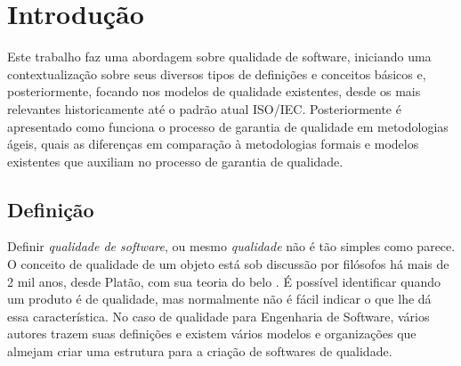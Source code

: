 \documentclass[
	12pt,				%
	openright,			%
	oneside,			%
	a4paper,			%
	english,			%
	brazil,				%
	]{abntex2}
\begin{document}
\tableofcontents*
\cleardoublepage



\textual

\chapter[Introdução]{Introdução}

Este trabalho faz uma abordagem sobre qualidade de software, iniciando uma contextualização sobre seus diversos tipos de definições e conceitos básicos e, posteriormente, focando nos modelos de qualidade existentes, desde os mais relevantes historicamente até o padrão atual ISO/IEC. Posteriormente é apresentado como funciona o processo de garantia de qualidade em metodologias ágeis, quais as diferenças em comparação à metodologias formais e modelos existentes que auxiliam no processo de garantia de qualidade.

\section{Definição}

Definir \emph{qualidade de software}, ou mesmo \emph{qualidade} não é tão simples como parece. O conceito de qualidade de um objeto está sob discussão por filósofos há mais de 2 mil anos, desde Platão, com sua teoria do belo \cite{wagner2013}. É possível identificar quando um produto é de qualidade, mas normalmente não é fácil indicar o que lhe dá essa característica. No caso de qualidade para Engenharia de Software, vários autores trazem suas definições e existem vários modelos e organizações que almejam criar uma estrutura para a criação de softwares de qualidade.
\end{document}
